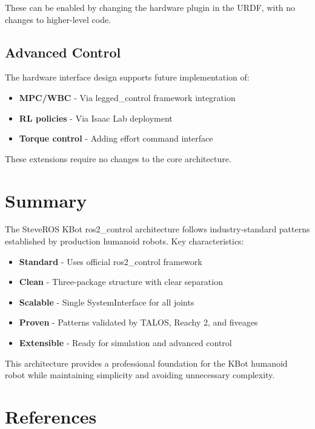 \documentclass[12pt,a4paper]{article}
\begin{document}
These can be enabled by changing the hardware plugin in the URDF, with no changes 
to higher-level code.

\subsection{Advanced Control}
The hardware interface design supports future implementation of:

\begin{itemize}
    \item \textbf{MPC/WBC} - Via legged\_control framework integration
    \item \textbf{RL policies} - Via Isaac Lab deployment
    \item \textbf{Torque control} - Adding effort command interface
\end{itemize}

These extensions require no changes to the core architecture.

\section{Summary}

The SteveROS KBot ros2\_control architecture follows industry-standard patterns 
established by production humanoid robots. Key characteristics:

\begin{itemize}
    \item \textbf{Standard} - Uses official ros2\_control framework
    \item \textbf{Clean} - Three-package structure with clear separation
    \item \textbf{Scalable} - Single SystemInterface for all joints
    \item \textbf{Proven} - Patterns validated by TALOS, Reachy 2, and fiveages
    \item \textbf{Extensible} - Ready for simulation and advanced control
\end{itemize}

This architecture provides a professional foundation for the KBot humanoid robot 
while maintaining simplicity and avoiding unnecessary complexity.

\section{References}
\end{document}
